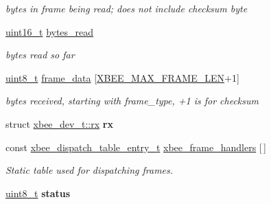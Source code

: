 \begin{DoxyCompactItemize}
\begin{DoxyCompactList}\small\item\em bytes in frame being read; does not include checksum byte \end{DoxyCompactList}\item 
\mbox{\label{group__xbee__device_gad7b2ae5814cb8706ab662a5d67e4837a}} 
\hyperlink{group__hal__dos_ga5a8b2dc9e45a9ee81a94ef304fb62505}{uint16\+\_\+t} \hyperlink{group__xbee__device_gad7b2ae5814cb8706ab662a5d67e4837a}{bytes\+\_\+read}
\begin{DoxyCompactList}\small\item\em bytes read so far \end{DoxyCompactList}\item 
\mbox{\label{group__xbee__device_gaa172073584adf9e2f74034489f9cd2a4}} 
\hyperlink{group__hal__dos_gae1affc9ca37cfb624959c866a73f83c2}{uint8\+\_\+t} \hyperlink{group__xbee__device_gaa172073584adf9e2f74034489f9cd2a4}{frame\+\_\+data} \mbox{[}\hyperlink{group__xbee__device_gad842f3c5f8d2264a99ab67a01054323a}{X\+B\+E\+E\+\_\+\+M\+A\+X\+\_\+\+F\+R\+A\+M\+E\+\_\+\+L\+EN}+1\mbox{]}
\begin{DoxyCompactList}\small\item\em bytes received, starting with frame\+\_\+type, +1 is for checksum \end{DoxyCompactList}\item 
\mbox{\label{group__xbee__device_ga43dd406313bf0281f9a7b9a6c1555fc6}} 
struct \hyperlink{structxbee__dev__t_1_1rx}{xbee\+\_\+dev\+\_\+t\+::rx} {\bfseries rx}
\item 
const \hyperlink{structxbee__dispatch__table__entry__t}{xbee\+\_\+dispatch\+\_\+table\+\_\+entry\+\_\+t} \hyperlink{group__xbee__device_ga1a91a1dc6e99737715fbf882842872c5}{xbee\+\_\+frame\+\_\+handlers} \mbox{[}$\,$\mbox{]}
\begin{DoxyCompactList}\small\item\em Static table used for dispatching frames. \end{DoxyCompactList}\item 
\mbox{\label{group__xbee__device_gade818037fd6c985038ff29656089758d}} 
\hyperlink{group__hal__dos_gae1affc9ca37cfb624959c866a73f83c2}{uint8\+\_\+t} {\bfseries status}
\end{DoxyCompactItemize}
